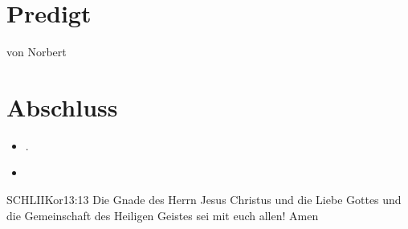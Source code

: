 \documentclass[fontsize=14pt]{mybib}
\newcommand{\Name}{Norbert}
\begin{document}
\section{Predigt}
    von \Name{}
\section{Abschluss}
\begin{itemize}
    \item [] .
    \item [] 
\end{itemize}
\begin{bibelbox}{SCHL}{IIKor}{13:13}
    Die Gnade des Herrn Jesus Christus und die Liebe Gottes und die Gemeinschaft des Heiligen Geistes sei mit euch allen! Amen
\end{bibelbox}
\end{document}
